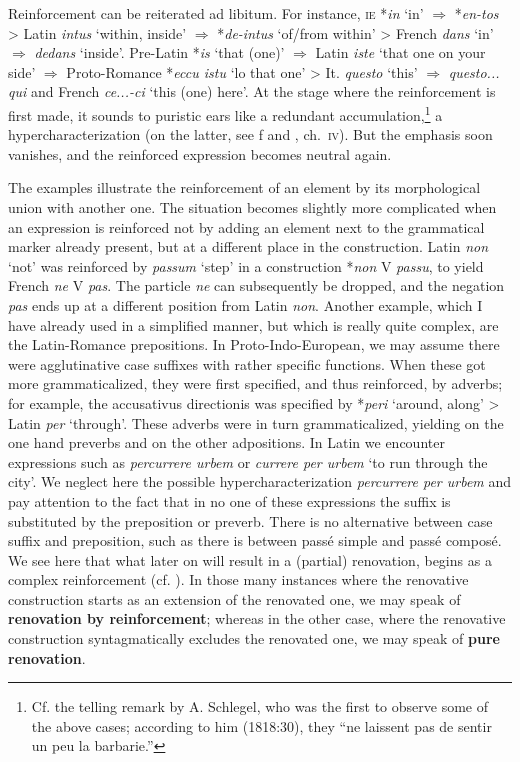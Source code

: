 Reinforcement can be reiterated ad libitum. For instance, \textsc{ie} *\textit{in} ‘in’ $\Rightarrow $ *\textit{en-tos} {\textgreater} Latin \textit{intus} ‘within, inside’ $\Rightarrow $ *\textit{de-intus} ‘of/from within’ {\textgreater} French \textit{dans} ‘in’ $\Rightarrow $ \textit{dedans} ‘inside’. Pre-Latin *\textit{is} ‘that (one)’ $\Rightarrow $ Latin \textit{iste} ‘that one on your side’ $\Rightarrow $ Proto-Romance *\textit{eccu istu} ‘lo that one’ {\textgreater} It. \textit{questo} ‘this’ $\Rightarrow $ \textit{questo... qui} and French \textit{ce...-ci} ‘this (one) here’. At the stage where the reinforcement is first made, it sounds to puristic ears like a redundant accumulation,\footnote{Cf. the telling remark by A. Schlegel, who was the first to observe some of the above cases; according to him (1818:30), they “ne laissent pas de sentir un peu la barbarie.”} a hypercharacterization (on the latter, see \citet{Malkiel1957}f and \citet{Tauli1966}, ch.~\textsc{iv}). But the emphasis soon vanishes, and the reinforced expression becomes neutral again.

The examples illustrate the reinforcement of an element by its morphological union with another one. The situation becomes slightly more complicated when an expression is reinforced not by adding an element next to the grammatical marker already present, but at a different place in the construction. Latin \textit{non} ‘not’ was reinforced by \textit{passum} ‘step’ in a construction *\textit{non} V \textit{passu}, to yield French \textit{ne} V \textit{pas}. The particle \textit{ne} can subsequently be dropped, and the negation \textit{pas} ends up at a different position from Latin \textit{non}. Another example, which I have already used in a simplified manner, but which is really quite complex, are the Latin-Romance prepositions. In Proto-Indo-European, we may assume there were agglutinative case suffixes with rather specific functions. When these got more grammaticalized, they were first specified, and thus reinforced, by adverbs; for example, the accusativus directionis was specified by *\textit{peri} ‘around, along’ {\textgreater} Latin \textit{per} ‘through’. These adverbs were in turn grammaticalized, yielding on the one hand preverbs and on the other adpositions. In Latin we encounter expressions such as \textit{percurrere urbem} or \textit{currere per urbem} ‘to run through the city’. We neglect here the possible hypercharacterization \textit{percurrere per urbem} and pay attention to the fact that in no one of these expressions the suffix is substituted by the preposition or preverb. There is no alternative between case suffix and preposition, such as there is between passé simple and passé composé. We see here that what later on will result in a (partial) renovation, begins as a complex reinforcement (cf. \citet[55]{Jakobson1936}). In those many instances where the renovative construction starts as an extension of the renovated one, we may speak of \textbf{renovation by reinforcement}; whereas in the other case, where the renovative construction syntagmatically excludes the renovated one, we may speak of \textbf{pure renovation}.

